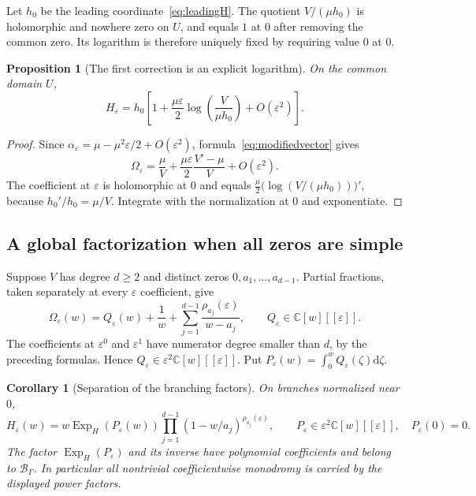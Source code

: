 \documentclass[11pt,a4paper]{article}
\numberwithin{equation}{section}
\newtheorem{proposition}[theorem]{Proposition}
\newtheorem{corollary}[theorem]{Corollary}
\theoremstyle{definition}
\theoremstyle{remark}
\newcommand{\C}{\mathbb C}
\newcommand{\B}{\mathscr B_\Gamma}
\newcommand{\eps}{\varepsilon}
\newcommand{\dd}{\mathrm d}
\newcommand{\ExpH}{\operatorname{Exp}_{\!H}}
\begin{document}
Let $h_0$ be the leading coordinate~\eqref{eq:leadingH}.  The quotient
$V/(\mu h_0)$ is holomorphic and nowhere zero on $U$, and equals $1$ at $0$
after removing the common zero.  Its logarithm is therefore uniquely fixed
by requiring value $0$ at $0$.

\begin{proposition}[The first correction is an explicit logarithm]
\label{prop:firstcorrection}
On the common domain $U$,
\begin{equation}\label{eq:firstcorrection}
 H_\eps
  =h_0\left[1+\frac{\mu\eps}{2}
       \log\!\left(\frac{V}{\mu h_0}\right)+O(\eps^2)\right].
\end{equation}
\end{proposition}

\begin{proof}
Since $\alpha_\eps=\mu-\mu^2\eps/2+O(\eps^2)$,
formula~\eqref{eq:modifiedvector} gives
\[
 \Omega_\eps=\frac\mu V
       +\frac{\mu\eps}{2}\frac{V'-\mu}{V}+O(\eps^2).
\]
The coefficient at $\eps$ is holomorphic at $0$ and equals
$\frac\mu2\bigl(\log(V/(\mu h_0))\bigr)'$, because
$h_0'/h_0=\mu/V$.  Integrate with the normalization at $0$ and exponentiate.
\end{proof}

\subsection{A global factorization when all zeros are simple}

Suppose $V$ has degree $d\ge2$ and distinct zeros $0,a_1,\ldots,a_{d-1}$.
Partial fractions, taken separately at every $\eps$ coefficient, give
\begin{equation}\label{eq:partialfractions}
 \Omega_\eps(w)=Q_\eps(w)+\frac1w
      +\sum_{j=1}^{d-1}\frac{\rho_{a_j}(\eps)}{w-a_j},
 \qquad Q_\eps\in\C[w][[\eps]].
\end{equation}
The coefficients at $\eps^0$ and $\eps^1$ have numerator degree smaller
than $d$, by the preceding formulas.  Hence $Q_\eps\in\eps^2\C[w][[\eps]]$.
Put $P_\eps(w)=\int_0^w Q_\eps(\zeta)\dd\zeta$.

\begin{corollary}[Separation of the branching factors]
\label{cor:factorization}
On branches normalized near $0$,
\begin{equation}\label{eq:fullfactorization}
 H_\eps(w)=w\ExpH(P_\eps(w))
      \prod_{j=1}^{d-1}(1-w/a_j)^{\rho_{a_j}(\eps)},
 \qquad P_\eps\in\eps^2\C[w][[\eps]],\quad P_\eps(0)=0.
\end{equation}
The factor $\ExpH(P_\eps)$ and its inverse have polynomial coefficients
and belong to $\B$.  In particular all nontrivial coefficientwise
monodromy is carried by the displayed power factors.
\end{corollary}
\end{document}
